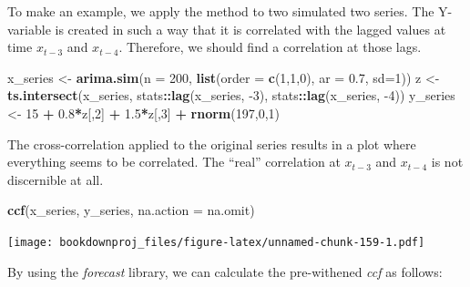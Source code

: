 \documentclass[
]{article}
\newenvironment{Shaded}{\begin{snugshade}}{\end{snugshade}}
\newcommand{\DataTypeTok}[1]{\textcolor[rgb]{0.13,0.29,0.53}{#1}}
\newcommand{\DecValTok}[1]{\textcolor[rgb]{0.00,0.00,0.81}{#1}}
\newcommand{\FloatTok}[1]{\textcolor[rgb]{0.00,0.00,0.81}{#1}}
\newcommand{\KeywordTok}[1]{\textcolor[rgb]{0.13,0.29,0.53}{\textbf{#1}}}
\newcommand{\NormalTok}[1]{#1}
\newcommand{\OperatorTok}[1]{\textcolor[rgb]{0.81,0.36,0.00}{\textbf{#1}}}
\newcommand{\StringTok}[1]{\textcolor[rgb]{0.31,0.60,0.02}{#1}}
\begin{document}
To make an example, we apply the method to two simulated two series. The Y-variable is created in such a way that it is correlated with the lagged values at time \(x_{t-3}\) and \(x_{t-4}\). Therefore, we should find a correlation at those lags.

\begin{Shaded}
\begin{Highlighting}[]
\NormalTok{x_series <-}\StringTok{ }\KeywordTok{arima.sim}\NormalTok{(}\DataTypeTok{n =} \DecValTok{200}\NormalTok{, }\KeywordTok{list}\NormalTok{(}\DataTypeTok{order =} \KeywordTok{c}\NormalTok{(}\DecValTok{1}\NormalTok{,}\DecValTok{1}\NormalTok{,}\DecValTok{0}\NormalTok{), }\DataTypeTok{ar =} \FloatTok{0.7}\NormalTok{, }\DataTypeTok{sd=}\DecValTok{1}\NormalTok{))}
\NormalTok{z <-}\StringTok{ }\KeywordTok{ts.intersect}\NormalTok{(x_series, stats}\OperatorTok{::}\KeywordTok{lag}\NormalTok{(x_series, }\DecValTok{-3}\NormalTok{), stats}\OperatorTok{::}\KeywordTok{lag}\NormalTok{(x_series, }\DecValTok{-4}\NormalTok{)) }
\NormalTok{y_series <-}\StringTok{ }\DecValTok{15} \OperatorTok{+}\StringTok{ }\FloatTok{0.8}\OperatorTok{*}\NormalTok{z[,}\DecValTok{2}\NormalTok{] }\OperatorTok{+}\StringTok{ }\FloatTok{1.5}\OperatorTok{*}\NormalTok{z[,}\DecValTok{3}\NormalTok{] }\OperatorTok{+}\StringTok{ }\KeywordTok{rnorm}\NormalTok{(}\DecValTok{197}\NormalTok{,}\DecValTok{0}\NormalTok{,}\DecValTok{1}\NormalTok{)}
\end{Highlighting}
\end{Shaded}

The cross-correlation applied to the original series results in a plot where everything seems to be correlated. The ``real'' correlation at \(x_{t-3}\) and \(x_{t-4}\) is not discernible at all.

\begin{Shaded}
\begin{Highlighting}[]
\KeywordTok{ccf}\NormalTok{(x_series, y_series, }\DataTypeTok{na.action =}\NormalTok{ na.omit)}
\end{Highlighting}
\end{Shaded}

\texttt{[image: bookdownproj\_files/figure-latex/unnamed-chunk-159-1.pdf]}

By using the \emph{forecast} library, we can calculate the pre-withened \emph{ccf} as follows:
\end{document}
